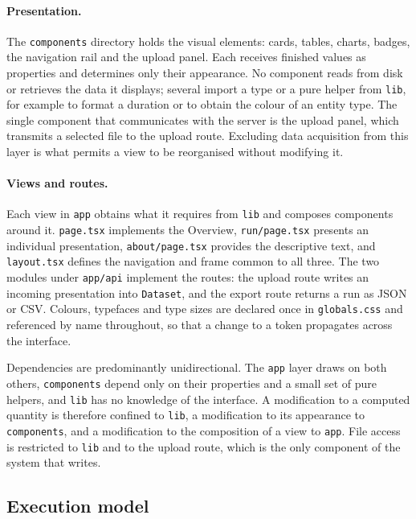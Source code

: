 \documentclass[11pt,a4paper]{article}
\begin{document}
\paragraph{Presentation.}
The \texttt{components} directory holds the visual elements: cards, tables,
charts, badges, the navigation rail and the upload panel. Each receives finished
values as properties and determines only their appearance. No component reads
from disk or retrieves the data it displays; several import a type or a pure
helper from \texttt{lib}, for example to format a duration or to obtain the
colour of an entity type. The single component that communicates with the server
is the upload panel, which transmits a selected file to the upload route.
Excluding data acquisition from this layer is what permits a view to be
reorganised without modifying it.

\paragraph{Views and routes.}
Each view in \texttt{app} obtains what it requires from \texttt{lib} and composes
components around it. \texttt{page.tsx} implements the Overview,
\texttt{run/page.tsx} presents an individual presentation, \texttt{about/page.tsx}
provides the descriptive text, and \texttt{layout.tsx} defines the navigation and
frame common to all three. The two modules under \texttt{app/api} implement the
routes: the upload route writes an incoming presentation into \texttt{Dataset}, and the
export route returns a run as JSON or CSV. Colours, typefaces and type sizes are
declared once in \texttt{globals.css} and referenced by name throughout, so that
a change to a token propagates across the interface.

Dependencies are predominantly unidirectional. The \texttt{app} layer draws on
both others, \texttt{components} depend only on their properties and a small set
of pure helpers, and \texttt{lib} has no knowledge of the interface. A
modification to a computed quantity is therefore confined to \texttt{lib}, a
modification to its appearance to \texttt{components}, and a modification to the
composition of a view to \texttt{app}. File access is restricted to \texttt{lib}
and to the upload route, which is the only component of the system that writes.

\subsection{Execution model}
\end{document}
